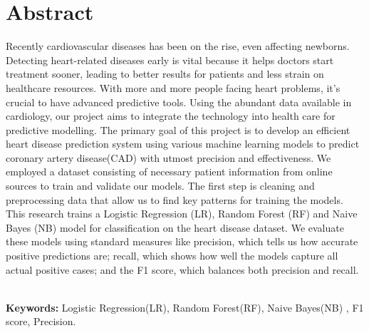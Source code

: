 \chapter*{\center \Large  Abstract}
Recently cardiovascular diseases has been on the rise, even affecting newborns. 
Detecting heart-related diseases early is vital because it helps doctors start treatment 
sooner, leading to better results for patients and less strain on healthcare resources. With 
more and more people facing heart problems, it's crucial to have advanced predictive tools. 
Using the abundant data available in cardiology, our project aims to integrate the technology 
into health care for predictive modelling. The primary goal of this project is to develop an 
efficient heart disease prediction system using various machine learning models to predict 
coronary artery disease(CAD) with utmost precision and effectiveness. We employed a dataset 
consisting of necessary patient information from online sources to train and validate our 
models. The first step is cleaning and preprocessing data that allow us to find key patterns 
for training the models. This research trains a Logistic Regression (LR), Random Forest (RF) and Naive Bayes (NB) model for classification on the heart disease dataset. We evaluate these models using standard measures like precision, 
which tells us how accurate positive predictions are; recall, which shows how well the models 
capture all actual positive cases; and the F1 score, which balances both precision and recall.



~\\[1cm]
\noindent %
\textbf{Keywords:} Logistic Regression(LR), Random Forest(RF), Naive Bayes(NB) , F1 score, Precision.


\vfill
\noindent
